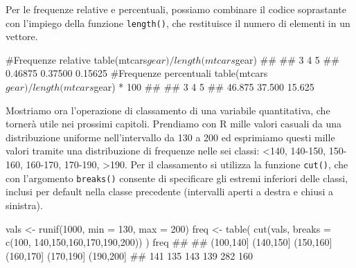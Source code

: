 \documentclass[a4paper,12pt,oneside]{book}
\newenvironment{Shaded}{\begin{snugshade}}{\end{snugshade}}
\newcommand{\DecValTok}[1]{#1}
\newcommand{\SpecialCharTok}[1]{#1}
\newcommand{\CommentTok}[1]{#1}
\newcommand{\DocumentationTok}[1]{#1}
\newcommand{\OtherTok}[1]{#1}
\newcommand{\FunctionTok}[1]{#1}
\newcommand{\AttributeTok}[1]{#1}
\newcommand{\NormalTok}[1]{#1}
\begin{document}
Per le frequenze relative e percentuali, possiamo combinare il codice soprastante con l'impiego della funzione \texttt{length()}, che restituisce il numero di elementi in un vettore.

\begin{Shaded}
\begin{Highlighting}[]
\CommentTok{\#Frequenze relative}
\FunctionTok{table}\NormalTok{(mtcars}\SpecialCharTok{$}\NormalTok{gear)}\SpecialCharTok{/}\FunctionTok{length}\NormalTok{(mtcars}\SpecialCharTok{$}\NormalTok{gear)}
\DocumentationTok{\#\# }
\DocumentationTok{\#\#       3       4       5 }
\DocumentationTok{\#\# 0.46875 0.37500 0.15625}
\CommentTok{\#Frequenze percentuali}
\FunctionTok{table}\NormalTok{(mtcars}\SpecialCharTok{$}\NormalTok{gear)}\SpecialCharTok{/}\FunctionTok{length}\NormalTok{(mtcars}\SpecialCharTok{$}\NormalTok{gear) }\SpecialCharTok{*} \DecValTok{100}
\DocumentationTok{\#\# }
\DocumentationTok{\#\#      3      4      5 }
\DocumentationTok{\#\# 46.875 37.500 15.625}
\end{Highlighting}
\end{Shaded}

Mostriamo ora l'operazione di classamento di una variabile quantitativa, che tornerà utile nei prossimi capitoli. Prendiamo con R mille valori casuali da una distribuzione uniforme nell'intervallo da 130 a 200 ed esprimiamo questi mille valori tramite una distribuzione di frequenze nelle sei classi: \textless140, 140-150, 150-160, 160-170, 170-190, \textgreater190. Per il classamento si utilizza la funzione \texttt{cut()}, che con l'argomento \texttt{breaks()} consente di specificare gli estremi inferiori delle classi, inclusi per default nella classe precedente (intervalli aperti a destra e chiusi a sinistra).

\begin{Shaded}
\begin{Highlighting}[]
\NormalTok{vals }\OtherTok{\textless{}{-}} \FunctionTok{runif}\NormalTok{(}\DecValTok{1000}\NormalTok{, }\AttributeTok{min =} \DecValTok{130}\NormalTok{, }\AttributeTok{max =} \DecValTok{200}\NormalTok{)}
\NormalTok{freq }\OtherTok{\textless{}{-}} \FunctionTok{table}\NormalTok{( }\FunctionTok{cut}\NormalTok{(vals, }\AttributeTok{breaks =} \FunctionTok{c}\NormalTok{(}\DecValTok{100}\NormalTok{, }\DecValTok{140}\NormalTok{,}\DecValTok{150}\NormalTok{,}\DecValTok{160}\NormalTok{,}\DecValTok{170}\NormalTok{,}\DecValTok{190}\NormalTok{,}\DecValTok{200}\NormalTok{)) )}
\NormalTok{freq}
\DocumentationTok{\#\# }
\DocumentationTok{\#\# (100,140] (140,150] (150,160] (160,170] (170,190] (190,200] }
\DocumentationTok{\#\#       141       135       143       139       282       160}
\end{Highlighting}
\end{Shaded}
\end{document}
